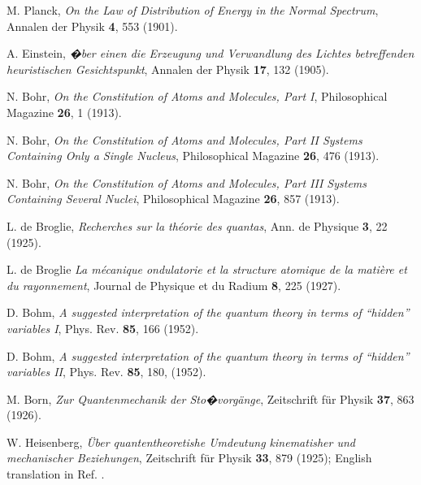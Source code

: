 \documentclass[nofootinbib, secnumarabic, amsmath, nobibnotes,10pt,aps,pra]{revtex4-1}
\begin{document}
\setcounter{enumiv}{0}
\begin{thebibliography}{999}

M. Planck, \emph{On the Law of Distribution of Energy in the Normal Spectrum}, Annalen der Physik \textbf{4},   553 (1901).

A. Einstein, \emph{�ber einen die Erzeugung und Verwandlung des Lichtes betreffenden heuristischen Gesichtspunkt}, Annalen der Physik \textbf{17},   132 (1905).

N. Bohr, \emph{On the Constitution of Atoms and Molecules, Part I}, Philosophical Magazine \textbf{26},  1 (1913).

N. Bohr, \emph{On the Constitution of Atoms and Molecules, Part II Systems Containing Only a Single Nucleus}, Philosophical Magazine \textbf{26},  476 (1913).

N. Bohr, \emph{On the Constitution of Atoms and Molecules, Part III Systems Containing Several Nuclei}, Philosophical Magazine \textbf{26},  857 (1913).

L. de Broglie, \emph{Recherches sur la th\'{e}orie des quantas}, Ann. de Physique \textbf{3},  22 (1925).

L. de Broglie \emph{La m\'{e}canique ondulatorie et la structure atomique de la mati\`ere et du rayonnement}, Journal de Physique et du Radium \textbf{8},  225 (1927).

D. Bohm, \emph{A suggested interpretation of the quantum theory in terms of ``hidden'' variables  I}, Phys. Rev. {\bf 85},  166 (1952).

D. Bohm, \emph{A suggested interpretation of the quantum theory in terms of ``hidden'' variables  II}, Phys. Rev. {\bf 85},  180, (1952).

M. Born, \emph{Zur Quantenmechanik der Sto�vorg\"{a}nge}, Zeitschrift f\"{u}r Physik \textbf{37},  863 (1926).

W. Heisenberg, \emph{\"{U}ber quantentheoretishe Umdeutung kinematisher und mechanischer Beziehungen}, Zeitschrift f\"{u}r Physik \textbf{33},  879 (1925); English translation in Ref. \cite{om.waerden}.


\end{thebibliography}
\end{document}
